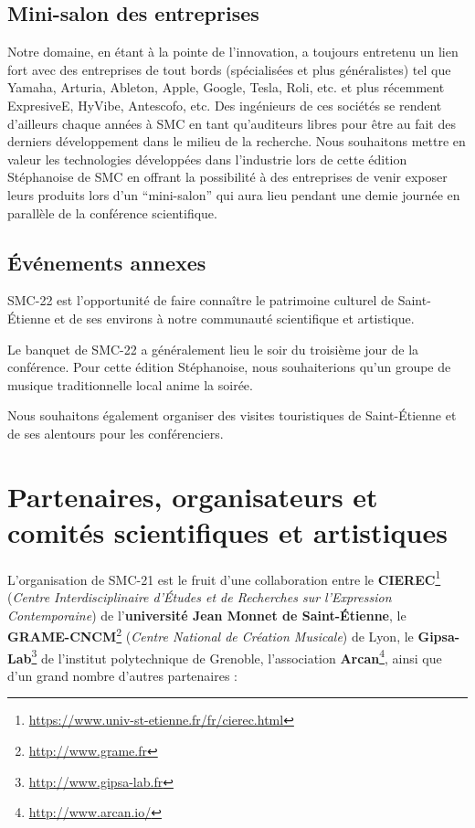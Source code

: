 \documentclass[fontsize=12pt]{scrartcl} %
\numberwithin{equation}{section} %
\numberwithin{figure}{section} %
\numberwithin{table}{section} %
\begin{document}
\subsection{Mini-salon des entreprises}

Notre domaine, en étant à la pointe de l'innovation, a toujours entretenu un lien fort avec des entreprises de tout bords (spécialisées et plus généralistes) tel que Yamaha, Arturia, Ableton, Apple, Google, Tesla, Roli, etc. et plus récemment ExpresiveE, HyVibe, Antescofo, etc. Des ingénieurs de ces sociétés se rendent d'ailleurs chaque années à SMC en tant qu'auditeurs libres pour être au fait des derniers développement dans le milieu de la recherche. Nous souhaitons mettre en valeur les technologies développées dans l'industrie lors de cette édition Stéphanoise de SMC en offrant la possibilité à des entreprises de venir exposer leurs produits lors d'un ``mini-salon'' qui aura lieu pendant une demie journée en parallèle de la conférence scientifique.   

\subsection{Événements annexes}

SMC-22 est l'opportunité de faire connaître le patrimoine culturel de Saint-Étienne et de ses environs à notre communauté scientifique et artistique. 

Le banquet de SMC-22 a généralement lieu le soir du troisième jour de la conférence. Pour cette édition Stéphanoise, nous souhaiterions qu'un groupe de musique traditionnelle local anime la soirée.

Nous souhaitons également organiser des visites touristiques de Saint-Étienne et de ses alentours pour les conférenciers.

\section{Partenaires, organisateurs et comités scientifiques et artistiques}
\label{sec:part}

L'organisation de SMC-21 est le fruit d'une collaboration entre le \textbf{CIEREC}\footnote{\url{https://www.univ-st-etienne.fr/fr/cierec.html}} (\textit{Centre Interdisciplinaire d'Études et de Recherches sur l'Expression Contemporaine}) de l'\textbf{université Jean Monnet de Saint-Étienne}, le \textbf{GRAME-CNCM}\footnote{\url{http://www.grame.fr}} (\textit{Centre National de Création Musicale}) de Lyon, le \textbf{Gipsa-Lab}\footnote{\url{http://www.gipsa-lab.fr}} de l'institut polytechnique de Grenoble, l'association \textbf{Arcan}\footnote{\url{http://www.arcan.io/}}, ainsi que d'un grand nombre d'autres partenaires :
\end{document}
